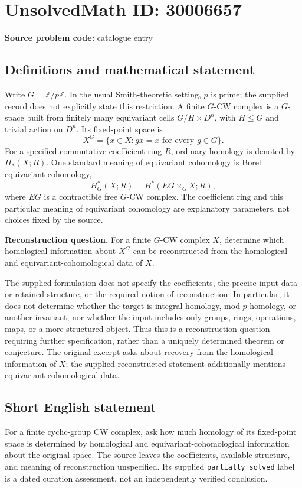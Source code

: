 \documentclass[11pt]{article}
\newcommand{\Z}{\mathbb{Z}}
\begin{document}
\section*{UnsolvedMath ID: 30006657}
\textbf{Source problem code:} catalogue entry
\subsection{Definitions and mathematical statement}
Write \(G=\Z/p\Z\). In the usual Smith-theoretic setting, \(p\) is prime; the supplied record does not explicitly state this restriction. A finite \(G\)-CW complex is a \(G\)-space built from finitely many equivariant cells \(G/H\times D^n\), with \(H\leq G\) and trivial action on \(D^n\). Its fixed-point space is
\[
X^G=\{x\in X: gx=x\text{ for every }g\in G\}.
\]
For a specified commutative coefficient ring \(R\), ordinary homology is denoted by \(H_*(X;R)\). One standard meaning of equivariant cohomology is Borel equivariant cohomology,
\[
H_G^*(X;R)=H^*(EG\times_G X;R),
\]
where \(EG\) is a contractible free \(G\)-CW complex. The coefficient ring and this particular meaning of equivariant cohomology are explanatory parameters, not choices fixed by the source.

\textbf{Reconstruction question.} For a finite \(G\)-CW complex \(X\), determine which homological information about \(X^G\) can be reconstructed from the homological and equivariant-cohomological data of \(X\).

The supplied formulation does not specify the coefficients, the precise input data or retained structure, or the required notion of reconstruction. In particular, it does not determine whether the target is integral homology, mod-\(p\) homology, or another invariant, nor whether the input includes only groups, rings, operations, maps, or a more structured object. Thus this is a reconstruction question requiring further specification, rather than a uniquely determined theorem or conjecture. The original excerpt asks about recovery from the homological information of \(X\); the supplied reconstructed statement additionally mentions equivariant-cohomological data.
\subsection{Short English statement}
For a finite cyclic-group CW complex, ask how much homology of its fixed-point space is determined by homological and equivariant-cohomological information about the original space. The source leaves the coefficients, available structure, and meaning of reconstruction unspecified. Its supplied \texttt{partially\_solved} label is a dated curation assessment, not an independently verified conclusion.
\end{document}
